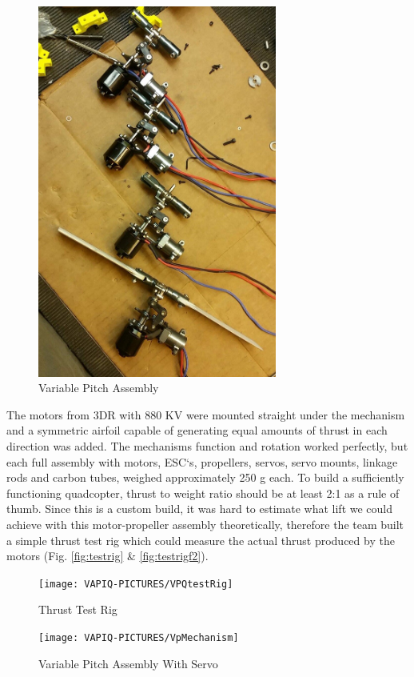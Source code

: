 \begin{figure}[h]
\begin{minipage}[b]{0.4\textwidth}
            \includegraphics[width = 0.7\textwidth]{VAPIQ-PICTURES/AfterAssemblyVPQ.jpg}
            \caption{Variable Pitch Assembly}
            \label{fig:after}
        \end{minipage}
\end{figure}

The motors from 3DR with 880 KV were mounted straight under the mechanism and a symmetric airfoil capable of generating equal amounts of thrust in each direction was added. The mechanisms function and rotation worked perfectly, but each full assembly with motors, ESC`s, propellers, servos, servo mounts, linkage rods and carbon tubes, weighed approximately 250 g each. To build a sufficiently functioning quadcopter, thrust to weight ratio should be at least 2:1 as a rule of thumb. Since this is a custom build, it was hard to estimate what lift we could achieve with this motor-propeller assembly theoretically, therefore the team built a simple thrust test rig which could measure the actual thrust produced by the motors (Fig. \ref{fig:testrig} \& \ref{fig:testrigf2}). 

\begin{figure}[h]
        \centering
         \begin{minipage}[b]{0.4\textwidth}
            \texttt{[image: VAPIQ-PICTURES/VPQtestRig]}
              \caption{Thrust Test Rig}
            \label{fig:testrig}
        \end{minipage}
        \hfill
        \begin{minipage}[b]{0.4\textwidth}
            \texttt{[image: VAPIQ-PICTURES/VpMechanism]}
            \caption{Variable Pitch Assembly With Servo}
            \label{fig:testrig2}
        \end{minipage}
\end{figure}


